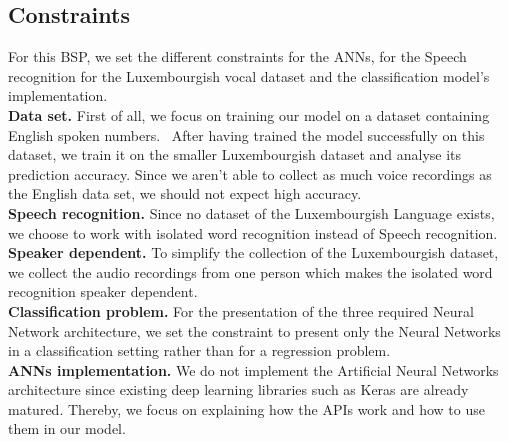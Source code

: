 \subsection{Constraints}

For this BSP, we set the different constraints for the ANNs, for the Speech
recognition for the Luxembourgish vocal dataset and the classification model's
implementation.\\

\textbf{Data set.} First of all, we focus on training our model on a dataset
containing English spoken numbers.~\cite{DBLP} After having trained the model
successfully on this dataset, we train it on the smaller Luxembourgish dataset
and analyse its prediction accuracy. Since we aren't able to collect as much
voice recordings as the English data set, we should not expect high accuracy.\\


\textbf{Speech recognition.} Since no dataset of the Luxembourgish Language
exists, we choose to work with isolated word recognition instead of Speech
recognition.\\

\textbf{Speaker dependent.} To simplify the collection of the Luxembourgish
dataset, we collect the audio recordings from one person which makes the
isolated word recognition speaker dependent.\\

\textbf{Classification problem.} For the presentation of the three required
Neural Network architecture, we set the constraint to present only the Neural
Networks in a classification setting rather than for a regression problem. \\

\textbf{ANNs implementation.} We do not implement the Artificial Neural Networks
architecture since existing deep learning libraries such as Keras are already
matured. Thereby, we focus on explaining how the APIs work and how to use them
in our model.
